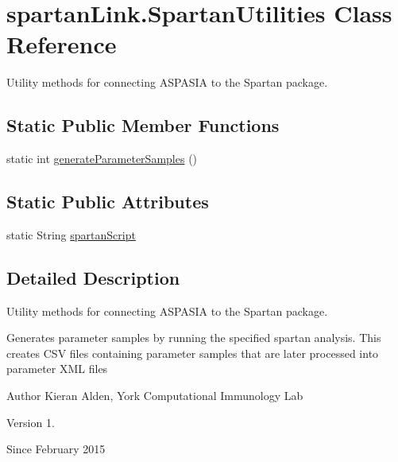 \hypertarget{classspartanLink_1_1SpartanUtilities}{}\section{spartan\+Link.\+Spartan\+Utilities Class Reference}
\label{classspartanLink_1_1SpartanUtilities}


Utility methods for connecting A\+S\+P\+A\+S\+I\+A to the Spartan package.  


\subsection*{Static Public Member Functions}
\begin{DoxyCompactItemize}
\item 
static int \hyperlink{classspartanLink_1_1SpartanUtilities_abdcfe381b552d02ce54d620f33950a20}{generate\+Parameter\+Samples} ()
\end{DoxyCompactItemize}
\subsection*{Static Public Attributes}
\begin{DoxyCompactItemize}
\item 
static String \hyperlink{classspartanLink_1_1SpartanUtilities_a79efc6e5f7dbc9419cfe477d0ec3f053}{spartan\+Script}
\end{DoxyCompactItemize}


\subsection{Detailed Description}
Utility methods for connecting A\+S\+P\+A\+S\+I\+A to the Spartan package. 

Generates parameter samples by running the specified spartan analysis. This creates C\+S\+V files containing parameter samples that are later processed into parameter X\+M\+L files

\begin{DoxyAuthor}{Author}
Kieran Alden, York Computational Immunology Lab 
\end{DoxyAuthor}
\begin{DoxyVersion}{Version}
1. 
\end{DoxyVersion}
\begin{DoxySince}{Since}
February 2015 
\end{DoxySince}


